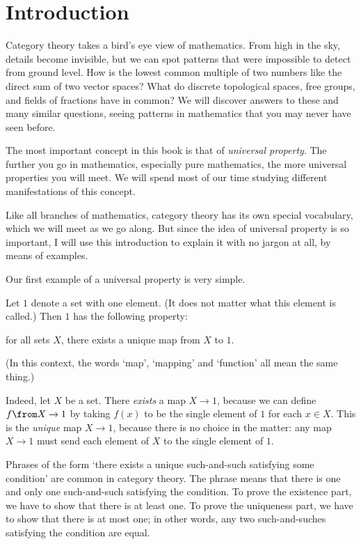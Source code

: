 \chapter*{Introduction}
\label{ch:intro}

Category theory takes a bird's eye view of mathematics.  From high in the sky,
details become invisible, but we can spot patterns that were impossible to
detect from ground level.  How is the lowest common multiple of two numbers
like the direct sum of two vector spaces?  What do discrete topological
spaces, free groups, and fields of fractions have in common?  We will
discover answers to these and many similar questions, seeing patterns in
mathematics that you may never have seen before.

The most important concept in this book is that of \emph{universal%
%
%
property}.  The further you go in mathematics, especially pure mathematics,
the more universal properties you will meet.  We will spend most of our
time studying different manifestations of this concept.

Like all branches of mathematics, category theory has its own special
vocabulary, which we will meet as we go along.  But since the idea of
universal property is so important, I will use this introduction to explain
it with no jargon at all, by means of examples.

Our first example of a universal property is very simple.

\begin{iexample} 
\label{eg:univ-terminal-set}
Let $1$%
%
%
denote a set with one%
%
%
element.  (It does not matter what this element is called.)  Then $1$ has
the following property:
% 
\begin{displaytext}
for all sets $X$, there exists a unique map from $X$ to $1$.
\end{displaytext}
% 
(In this context, the words `map', `mapping' and `function' all mean the
same thing.)

Indeed, let $X$ be a set.  There \emph{exists} a map $X \to 1$, because we
can define $f\from X \to 1$ by taking $f(x)$ to be the single element of
$1$ for each $x \in X$.  This is the \emph{unique} map $X \to 1$, because
there is no choice in the matter: any map $X \to 1$ must send each element
of $X$ to the single element of $1$.
\end{iexample}

Phrases of the form `there exists a unique%
%
% 
such-and-such satisfying some condition' are common in category theory.
The phrase means that there is one and only one such-and-such satisfying
the condition.  To prove the existence part, we have to show that there is
at least one.  To prove the uniqueness part, we have to show that there is
at most one; in other words, any two such-and-suches satisfying the
condition are equal.


